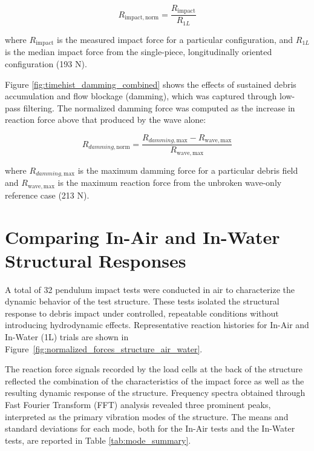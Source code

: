 \documentclass[10pt,a4paper]{article}
\begin{document}
\begin{equation}
    R_{\mathrm{impact,norm}} = 
    \frac{R_{\mathrm{impact}}}{R_{1L}}
    \label{eq:impact_norm}
\end{equation}

\noindent
where \( R_{\mathrm{impact}} \) is the measured impact force for a particular configuration, and \( R_{1L} \) is the median impact force from the single-piece, longitudinally oriented configuration (193 N).

Figure \ref{fig:timehist_damming_combined} shows the effects of sustained debris accumulation and flow blockage (damming), which was captured through low-pass filtering. The normalized damming force was computed as the increase in reaction force above that produced by the wave alone:

\begin{equation}
    R_{damming,\mathrm{norm}} = 
    \frac{R_{damming,\mathrm{max}} - R_{\mathrm{wave,max}}}
         {R_{\mathrm{wave,max}}}
    \label{eq:damming_norm}
\end{equation}

where \( R_{damming,\mathrm{max}} \) is the maximum damming force for a particular debris field and \( R_{\mathrm{wave,max}} \) is the maximum reaction force from the unbroken wave-only reference case (213 N).


\section{Comparing In-Air and In-Water Structural Responses} 

A total of 32 pendulum impact tests were conducted in air to characterize the dynamic behavior of the test structure.  These tests isolated the structural response to debris impact under controlled, repeatable conditions without introducing hydrodynamic effects. Representative reaction histories for In-Air and In-Water (1L) trials are shown in Figure~\ref{fig:normalized_forces_structure_air_water}. 

The reaction force signals recorded by the load cells at the back of the structure reflected the combination of the characteristics of the impact force as well as the resulting dynamic response of the structure. Frequency spectra obtained through Fast Fourier Transform (FFT) analysis revealed three prominent peaks, interpreted as the primary vibration modes of the structure. The means and standard deviations for each mode, both for the In-Air tests and the In-Water tests, are reported in Table \ref{tab:mode_summary}.
\end{document}
